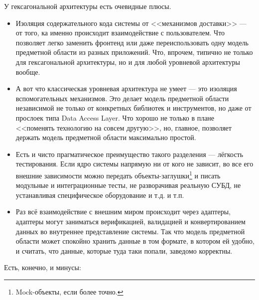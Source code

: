 \documentclass{../../text-style}
\begin{document}
У гексагональной архитектуры есть очевидные плюсы.

\begin{itemize}
    \item Изоляция содержательного кода системы от <<механизмов доставки>> --- от того, ка именно происходит взаимодействие с пользователем. Что позволяет легко заменить фронтенд или даже переиспользовать одну модель предметной области из разных приложений. Что, впрочем, типично не только для гексагональной архитектуры, но и для любой уровневой архитектуры вообще.
    \item А вот что классическая уровневая архитектура не умеет --- это изоляция вспомогательных механизмов. Это делает модель предметной области независимой не только от конкретных библиотек и инструментов, но даже от прослоек типа Data Access Layer. Что хорошо не только в плане <<поменять технологию на совсем другую>>, но, главное, позволяет держать модель предметной области максимально простой.
    \item Есть и чисто прагматическое преимущество такого разделения --- лёгкость тестирования. Если ядро системы напрямую ни от кого не зависит, во все его внешние зависимости можно передать объекты-заглушки\footnote{Mock-объекты, если более точно.} и писать модульные и интеграционные тесты, не разворачивая реальную СУБД, не устанавливая специфическое оборудование и т.д. и т.п.
    \item Раз всё взаимодействие с внешним миром происходит через адаптеры, адаптеры могут заниматься верификацией, валидацией и конвертированием данных во внутреннее представление системы. Так что модель предметной области может спокойно хранить данные в том формате, в котором ей удобно, и считать, что данные, которые туда таки попали, заведомо корректны.
\end{itemize}

Есть, конечно, и минусы:
\end{document}
